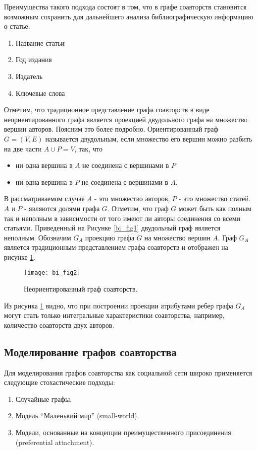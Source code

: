 Преимущества такого подхода состоят в том, что в графе соавторств становится возможным сохранить для дальнейшего анализа библиографическую информацию о статье: 

\begin{enumerate}
\tightlist
\item Название статьи 
\item Год издания 
\item Издатель 
\item Ключевые слова 
\end{enumerate}

Отметим, что традиционное представление графа соавторств в виде неориентированного графа является проекцией двудольного графа на множество вершин авторов. 
Поясним это более подробно. 
Ориентированный граф $G = (V,E)$  называется двудольным, если множество его вершин можно разбить на две части $ A \cup P = V$, так, что 
\begin{itemize}
	\item ни одна вершина в $A$ не соединена с вершинами в $P$
	\item ни одна вершина в $P$ не соединена с вершинами в $A$. 	
\end{itemize}

В рассматриваемом случае $A$ - это множество авторов, $P$ - это множество статей. $A$ и $P$ - являются долями графа $G$.
Отметим, что граф $G$ может быть как полным так и неполным в зависимости от того имеют ли авторы соединения со всеми статьями. 
Приведенный на Рисунке \ref{bi_fig1} двудольный граф является неполным. 
Обозначим  $G_A$ проекцию графа  $G$ на множество вершин $A$.
Граф $G_A$ является традиционным представлением графа соавторств и отображен на рисунке \ref{fig:bi2}. 

\begin{figure}[H]
  \centering
    \texttt{[image: bi\_fig2]}
  \label{fig:bi2}
  \caption{Неориентированный граф соавторств.}
\end{figure}  

Из рисунка \ref{fig:bi2} видно, что при построении проекции атрибутами ребер графа $G_A$ могут стать только интегральные характеристики соавторства, например, количество соавторств двух авторов.

\subsection{Моделирование графов соавторства}
Для моделирования графов соавторства как социальной сети широко применяется следующие стохастические подходы: 
\begin{enumerate}
\item Случайные графы.
\item Модель ``Маленький мир'' (small-world).
\item Модели, основанные на концепции преимущественного присоединения (preferential attachment).
\end{enumerate}

